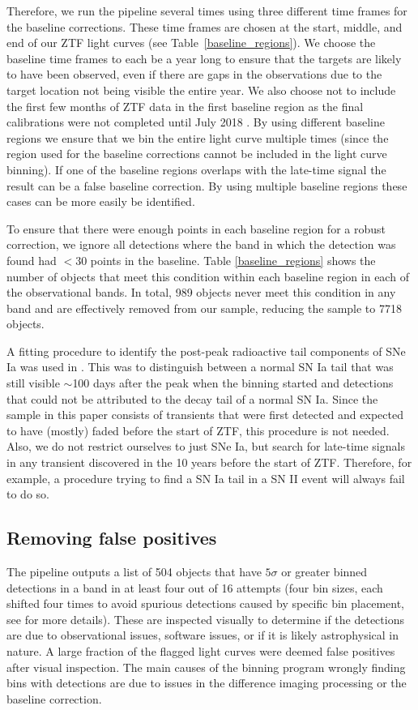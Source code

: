 \documentclass[a4paper,oneside,12pt, class=Latex/Classes/PhDthesisPSnPDF, crop=false]{standalone}
\begin{document}
Therefore, we run the pipeline several times using three different time frames for the baseline corrections. These time frames are chosen at the start, middle, and end of our ZTF light curves (see Table~\ref{baseline_regions}). We choose the baseline time frames to each be a year long to ensure that the targets are likely to have been observed, even if there are gaps in the observations due to the target location not being visible the entire year. We also choose not to include the first few months of ZTF data in the first baseline region as the final calibrations were not completed until July 2018 \citep{ZTF_overview_and_1st_results}. By using different baseline regions we ensure that we bin the entire light curve multiple times (since the region used for the baseline corrections cannot be included in the light curve binning). If one of the baseline regions overlaps with the late-time signal the result can be a false baseline correction. By using multiple baseline regions these cases can be more easily be identified. 

To ensure that there were enough points in each baseline region for a robust correction, we ignore all detections where the band in which the detection was found had $< 30$ points in the baseline. Table \ref{baseline_regions} shows the number of objects that meet this condition within each baseline region in each of the observational bands. In total, 989 objects never meet this condition in any band and are effectively removed from our sample, reducing the sample to 7718 objects.

A fitting procedure to identify the post-peak radioactive tail components of SNe Ia was used in \citet{Terwel_2024_paper1}. This was to distinguish between a normal SN Ia tail that was still visible $\sim$100 days after the peak when the binning started and detections that could not be attributed to the decay tail of a normal SN Ia. Since the sample in this paper consists of transients that were first detected and expected to have (mostly) faded before the start of ZTF, this procedure is not needed. Also, we do not restrict ourselves to just SNe Ia, but search for late-time signals in any transient discovered in the 10 years before the start of ZTF. Therefore, for example, a procedure trying to find a SN Ia tail in a SN II event will always fail to do so.


\subsection{Removing false positives}
\label{sec:false_positives}
The pipeline outputs a list of 504 objects that have $5\sigma$ or greater binned detections in a band in at least four out of 16 attempts (four bin sizes, each shifted four times to avoid spurious detections caused by specific bin placement, see \citealt{Terwel_2024_paper1} for more details). These are inspected visually to determine if the detections are due to observational issues, software issues, or if it is likely astrophysical in nature. A large fraction of the flagged light curves were deemed false positives after visual inspection. The main causes of the binning program wrongly finding bins with detections are due to issues in the difference imaging processing or the baseline correction.
\end{document}
